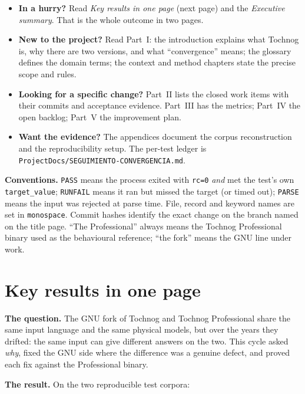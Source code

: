 \documentclass[11pt,a4paper]{report}
\newcommand{\code}[1]{\texttt{#1}}
\begin{document}
\begin{itemize}
  \item \textbf{In a hurry?} Read \emph{Key results in one page} (next page)
        and the \emph{Executive summary}. That is the whole outcome in two
        pages.
  \item \textbf{New to the project?} Read Part~I: the introduction explains
        what Tochnog is, why there are two versions, and what ``convergence''
        means; the glossary defines the domain terms; the context and method
        chapters state the precise scope and rules.
  \item \textbf{Looking for a specific change?} Part~II lists the closed work
        items with their commits and acceptance evidence. Part~III has the
        metrics; Part~IV the open backlog; Part~V the improvement plan.
  \item \textbf{Want the evidence?} The appendices document the corpus
        reconstruction and the reproducibility setup. The per-test ledger is
        \code{ProjectDocs/\allowbreak SEGUIMIENTO-\allowbreak CONVERGENCIA.md}.
\end{itemize}

\textbf{Conventions.} \code{PASS} means the process exited with \code{rc=0}
\emph{and} met the test's own \code{target\_\allowbreak value}; \code{RUNFAIL} means it ran
but missed the target (or timed out); \code{PARSE} means the input was rejected
at parse time. File, record and keyword names are set in \code{monospace}.
Commit hashes identify the exact change on the branch named on the title page.
``The Professional'' always means the Tochnog Professional binary used as the
behavioural reference; ``the fork'' means the GNU line under work.

\chapter*{Key results in one page}

\textbf{The question.} The GNU fork of Tochnog and Tochnog Professional share
the same input language and the same physical models, but over the years they
drifted: the same input can give different answers on the two. This cycle asked
\emph{why}, fixed the GNU side where the difference was a genuine defect, and
proved each fix against the Professional binary.

\textbf{The result.} On the two reproducible test corpora:
\end{document}

